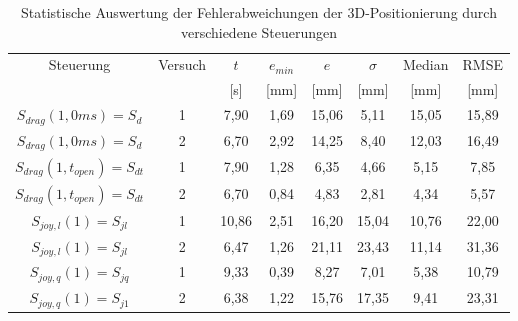 \begin{table}[htb]
	\caption{Statistische Auswertung der Fehlerabweichungen der 3D-Positionierung durch verschiedene Steuerungen}
	\label{table pos 3d}
	\begin{center}
		\begin{tabular}{|c|c|c|c|c|c|c|c|}
			\hline 
			Steuerung & Versuch & $t$ & $e_{min}$ & $e$  & $\sigma$ & Median & RMSE \\ 
			&  & [s] & [mm] & [mm] & [mm] & [mm] & [mm] \\
			\hline 
			$S_{drag}(1,0ms)=S_{d}$ & 1 & 7,90 & 1,69 & 15,06 & 5,11 & 15,05 & 15,89 \\ 
			\hline
			$S_{drag}(1,0ms)=S_{d}$ & 2 & 6,70 & 2,92 & 14,25 & 8,40 & 12,03 & 16,49  \\ 
			\hline 
			$S_{drag}(1,t_{open})=S_{dt}$& 1 & 7,90 & 1,28 & 6,35 & 4,66 & 5,15 & 7,85  \\ 
			\hline 
			$S_{drag}(1,t_{open})=S_{dt}$ & 2 & 6,70 & 0,84 & 4,83 & 2,81 & 4,34 & 5,57  \\ 
			\hline 
			$S_{joy,l}(1)=S_{jl}$ & 1 & 10,86 & 2,51 & 16,20 & 15,04 & 10,76 & 22,00  \\ 
			\hline 
			$S_{joy,l}(1)=S_{jl}$ & 2 & 6,47 & 1,26 & 21,11 & 23,43 & 11,14 & 31,36  \\ 
			\hline 
			$S_{joy,q}(1)=S_{jq}$ & 1 & 9,33 & 0,39 & 8,27 & 7,01 & 5,38 & 10,79  \\ 
			\hline 
			$S_{joy,q}(1)=S_{j1}$ & 2 & 6,38 & 1,22 & 15,76 & 17,35 & 9,41 & 23,31  \\ 
			\hline 
		\end{tabular} 
	\end{center}
\end{table}

